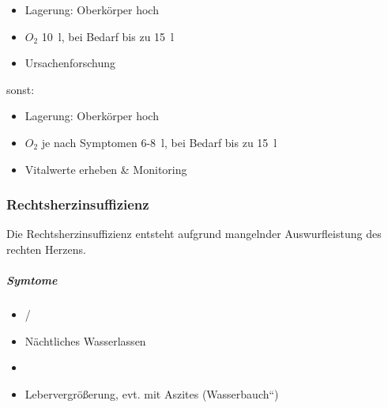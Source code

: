 \begin{gMassnahmenEnv}
    
    \gTxBeiVit \gTxMassVitBes
    
    \begin{itemize}
        \item Lagerung: Oberk\"orper hoch
        \item $O_2$ 10~l, bei Bedarf bis zu 15~l
        \item Ursachenforschung
    \end{itemize}
    
    sonst:
    
    \begin{itemize}
        \item Lagerung: Oberk\"orper hoch
        \item $O_2$ je nach Symptomen 6-8~l, bei Bedarf bis zu 15~l
        \item Vitalwerte erheben \& Monitoring
    \end{itemize}
\end{gMassnahmenEnv}


\subsubsection{Rechtsherzinsuffizienz}
Die Rechtsherzinsuffizienz entsteht aufgrund mangelnder Auswurfleistung
des rechten Herzens. 

\subparagraph{Symtome}


\begin{itemize}
	\item {}/
	\item Nächtliches Wasserlassen
	\item {} 
	\item Lebervergr\"o{\ss}erung, evt. mit Aszites
	({\quotedblbase}Wasserbauch{\textquotedblleft})
\end{itemize}

